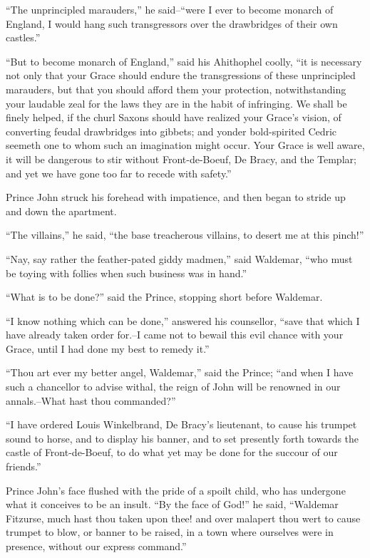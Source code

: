 ``The unprincipled marauders,'' he said--``were I ever to become monarch
of England, I would hang such transgressors over the drawbridges of
their own castles.''

``But to become monarch of England,'' said his Ahithophel coolly, ``it
is necessary not only that your Grace should endure the transgressions
of these unprincipled marauders, but that you should afford them your
protection, notwithstanding your laudable zeal for the laws they are in
the habit of infringing. We shall be finely helped, if the churl Saxons
should have realized your Grace's vision, of converting feudal
drawbridges into gibbets; and yonder bold-spirited Cedric seemeth one to
whom such an imagination might occur. Your Grace is well aware, it will
be dangerous to stir without Front-de-Boeuf, De Bracy, and the Templar;
and yet we have gone too far to recede with safety.''

Prince John struck his forehead with impatience, and then began to
stride up and down the apartment.

``The villains,'' he said, ``the base treacherous villains, to desert me
at this pinch!''

``Nay, say rather the feather-pated giddy madmen,'' said Waldemar, ``who
must be toying with follies when such business was in hand.''

``What is to be done?'' said the Prince, stopping short before Waldemar.

``I know nothing which can be done,'' answered his counsellor, ``save
that which I have already taken order for.--I came not to bewail this
evil chance with your Grace, until I had done my best to remedy it.''

``Thou art ever my better angel, Waldemar,'' said the Prince; ``and when
I have such a chancellor to advise withal, the reign of John will be
renowned in our annals.--What hast thou commanded?''

``I have ordered Louis Winkelbrand, De Bracy's lieutenant, to cause his
trumpet sound to horse, and to display his banner, and to set presently
forth towards the castle of Front-de-Boeuf, to do what yet may be done
for the succour of our friends.''

Prince John's face flushed with the pride of a spoilt child, who has
undergone what it conceives to be an insult. ``By the face of God!'' he
said, ``Waldemar Fitzurse, much hast thou taken upon thee! and over
malapert thou wert to cause trumpet to blow, or banner to be raised, in
a town where ourselves were in presence, without our express command.''

